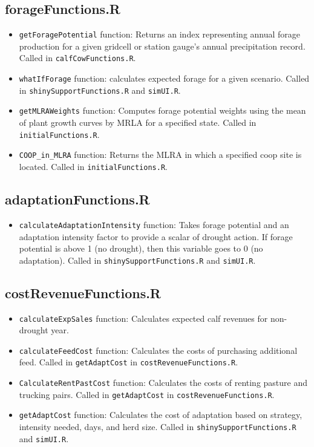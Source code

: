 \documentclass[11pt]{article}
\begin{document}
\subsection{forageFunctions.R}

\begin{itemize}
	\item \verb!getForagePotential! function: Returns an index representing
  annual forage production for a given gridcell or station gauge's annual precipitation record. Called in \verb!calfCowFunctions.R!.
	\item \verb!whatIfForage! function: calculates expected forage for a given scenario. Called in \verb!shinySupportFunctions.R! and \verb!simUI.R!.
	\item \verb!getMLRAWeights! function: Computes forage potential weights using the
  mean of plant growth curves by MRLA for a specified state. Called in \verb!initialFunctions.R!.
  	\item \verb!COOP_in_MLRA! function: Returns the MLRA in which a specified
  coop site is located. Called in \verb!initialFunctions.R!.
\end{itemize}

\subsection{adaptationFunctions.R}

\begin{itemize}
	\item \verb!calculateAdaptationIntensity! function: Takes forage potential and an adaptation intensity factor to provide a scalar of drought action. If forage potential is above 1 (no drought), then this variable goes to 0 (no adaptation). Called in \verb!shinySupportFunctions.R! and \verb!simUI.R!.
\end{itemize}

\subsection{costRevenueFunctions.R}

\begin{itemize}
	\item \verb!calculateExpSales! function: Calculates expected calf revenues for non-drought year. 
	\item \verb!calculateFeedCost! function: Calculates the costs of purchasing additional feed. Called in \verb!getAdaptCost! in \verb!costRevenueFunctions.R!. 
	\item \verb!CalculateRentPastCost! function: Calculates the costs of renting pasture and trucking pairs. Called in \verb!getAdaptCost! in \verb!costRevenueFunctions.R!.
	\item \verb!getAdaptCost! function: Calculates the cost of adaptation based on strategy, intensity needed, days, and herd size. Called in \verb!shinySupportFunctions.R! and \verb!simUI.R!.
\end{itemize}
\end{document}
